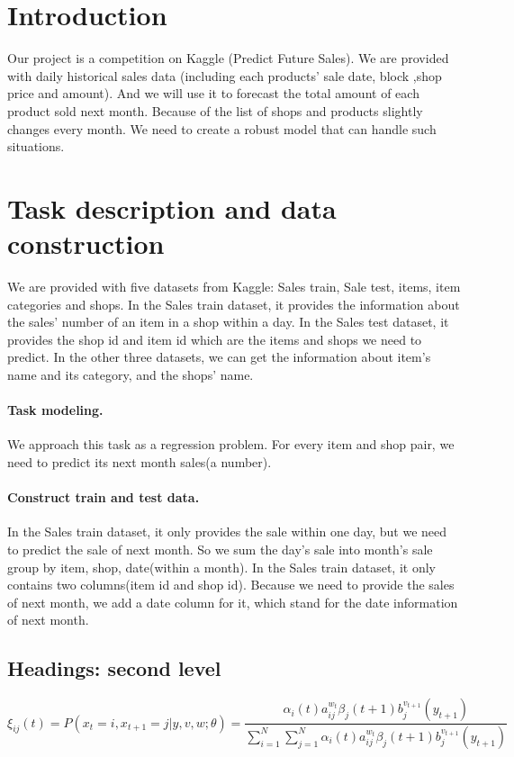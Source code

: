 \section{Introduction}
Our project is a competition on Kaggle (Predict Future Sales). We are provided with daily historical sales data (including each products’ sale date, block ,shop price and amount). And we will use it to forecast the total amount of each product sold next month. Because of the list of shops and products slightly changes every month. We need to create a robust model that can handle such situations.
\section{Task description and data construction}
\label{sec:headings}
We are provided with five datasets from Kaggle: Sales train, Sale test, items, item categories and shops. In the Sales train dataset, it provides the information about the sales’ number of an item in a shop within a day. In the Sales test dataset, it provides the shop id and item id which are the items and shops we need to predict. In the other three datasets, we can get the information about item’s name and its category, and the shops’ name.
\paragraph{Task modeling.}
We approach this task as a regression problem. For every item and shop pair, we need to predict its next month sales(a number).
\paragraph{Construct train and test data.}
In the Sales train dataset, it only provides the sale within one day, but we need to predict the sale of next month. So we sum the day's sale into month's sale group by item, shop, date(within a month).
In the Sales train dataset, it only contains two columns(item id and shop id). Because we need to provide the sales of next month, we add a date column for it, which stand for the date information of next month.

\subsection{Headings: second level}
\lipsum[5]
\begin{equation}
\xi _{ij}(t)=P(x_{t}=i,x_{t+1}=j|y,v,w;\theta)= {\frac {\alpha _{i}(t)a^{w_t}_{ij}\beta _{j}(t+1)b^{v_{t+1}}_{j}(y_{t+1})}{\sum _{i=1}^{N} \sum _{j=1}^{N} \alpha _{i}(t)a^{w_t}_{ij}\beta _{j}(t+1)b^{v_{t+1}}_{j}(y_{t+1})}}
\end{equation}

